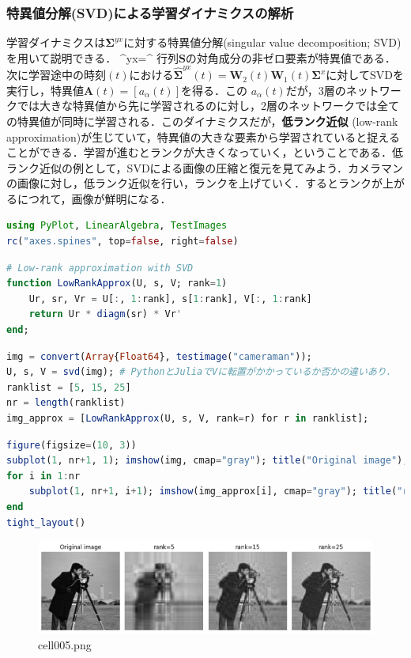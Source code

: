\subsubsection{特異値分解(SVD)による学習ダイナミクスの解析}
学習ダイナミクスは$ \mathbf{\Sigma}^{yx}$に対する特異値分解(singular value decomposition; SVD)を用いて説明できる．
\mathbf{\Sigma}^{yx}=^\top
行列$ \mathbf{ S}$の対角成分の非ゼロ要素が特異値である．次に学習途中の時刻$(t)$における$\hat{\mathbf{\Sigma}}^{yx}(t)=\mathbf{W}_2 (t) \mathbf{W}_1(t) \mathbf{\Sigma}^{x}$に対してSVDを実行し，特異値$\mathbf{A}(t)=[a_{\alpha}(t)]$を得る．この $a _ {\alpha}(t)$だが，3層のネットワークでは大きな特異値から先に学習されるのに対し，2層のネットワークでは全ての特異値が同時に学習される．このダイナミクスだが，\textbf{低ランク近似} (low-rank approximation)が生じていて，特異値の大きな要素から学習されていると捉えることができる．学習が進むとランクが大きくなっていく，ということである．低ランク近似の例として，SVDによる画像の圧縮と復元を見てみよう．カメラマンの画像に対し，低ランク近似を行い，ランクを上げていく．するとランクが上がるにつれて，画像が鮮明になる．
\begin{lstlisting}[language=julia]
using PyPlot, LinearAlgebra, TestImages
rc("axes.spines", top=false, right=false)
\end{lstlisting}
\begin{lstlisting}[language=julia]
# Low-rank approximation with SVD
function LowRankApprox(U, s, V; rank=1)
    Ur, sr, Vr = U[:, 1:rank], s[1:rank], V[:, 1:rank]
    return Ur * diagm(sr) * Vr'
end;
\end{lstlisting}
\begin{lstlisting}[language=julia]
img = convert(Array{Float64}, testimage("cameraman"));
U, s, V = svd(img); # PythonとJuliaでVに転置がかかっているか否かの違いあり．
ranklist = [5, 15, 25]
nr = length(ranklist)
img_approx = [LowRankApprox(U, s, V, rank=r) for r in ranklist];
\end{lstlisting}
\begin{lstlisting}[language=julia]
figure(figsize=(10, 3))
subplot(1, nr+1, 1); imshow(img, cmap="gray"); title("Original image"); axis("off")
for i in 1:nr
    subplot(1, nr+1, i+1); imshow(img_approx[i], cmap="gray"); title("rank="*string(ranklist[i])); axis("off")
end
tight_layout()
\end{lstlisting}
\begin{figure}[ht]
	\centering
	\includegraphics[scale=0.8, max width=\linewidth]{./fig/solve-credit-assignment-problem/linear-network-learning-dynamics/cell005.png}
	\caption{cell005.png}
	\label{cell005.png}
\end{figure}
